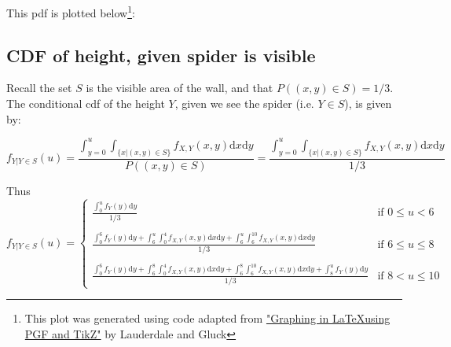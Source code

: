 \documentclass[paper=a4, fontsize=11pt]{scrartcl} %
\numberwithin{equation}{section} %
\numberwithin{figure}{section} %
\numberwithin{table}{section} %
\begin{document}
This pdf is plotted below\footnote{This plot was generated using code adapted from \href{http://gma.math.ufl.edu/files/tikz.pdf}{"Graphing in \LaTeX using PGF and TikZ"} by Lauderdale and Gluck}:

\begin{center}
\end{center}

\subsection{CDF of height, given spider is visible}

Recall the set $S$ is the visible area of the wall, and that $P((x,y)\in S) = 1/3$. The conditional cdf of the height $Y$, given we see the spider (i.e. $Y \in S$), is given by:

\begin{equation*}
f_{Y | {Y \in S}} (u) = \frac{\int_{y=0}^u \int_{\{x | (x,y) \in S \}} f_{X,Y}(x,y)\textrm{d}x\textrm{d}y}{P((x,y)\in S)} = \frac{\int_{y=0}^u \int_{\{x | (x,y) \in S \}} f_{X,Y}(x,y)\textrm{d}x\textrm{d}y}{1/3}
\end{equation*}

Thus
\[ 
f_{Y | {Y \in S}} (u) = 
	\begin{cases}
		\frac{\int_0^u f_Y(y) \textrm{d}y}{1/3} & \textrm{if } 0 \leq u <6 \\
		\\
		\frac{\int_0^6 f_Y(y) \textrm{d}y +\int_6^u \int_0^4 f_{X, Y}(x,y) \textrm{d}x\textrm{d}y + \int_6^u \int_6^{10} f_{X, Y}(x,y) \textrm{d}x\textrm{d}y }{1/3} & \textrm{if } 6 \leq u \leq 8\\
		\\
		\frac{\int_0^6 f_Y(y) \textrm{d}y +\int_6^8 \int_0^4 f_{X, Y}(x,y) \textrm{d}x\textrm{d}y + \int_6^8 \int_6^{10} f_{X, Y}(x,y) \textrm{d}x\textrm{d}y +\int_8^u f_Y(y) \textrm{d}y}{1/3} & \textrm{if } 8 < u \leq 10
	\end{cases}
\]
\end{document}
